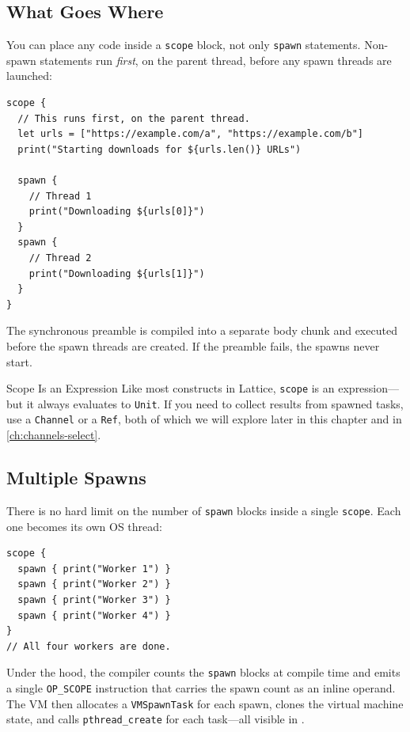 \subsection{What Goes Where}

You can place any code inside a \lstinline|scope| block, not only \lstinline|spawn| statements.
Non-spawn statements run \emph{first}, on the parent thread, before any spawn threads are launched:

\begin{lstlisting}[language=Lattice, caption={Synchronous setup inside a scope}]
scope {
  // This runs first, on the parent thread.
  let urls = ["https://example.com/a", "https://example.com/b"]
  print("Starting downloads for ${urls.len()} URLs")

  spawn {
    // Thread 1
    print("Downloading ${urls[0]}")
  }
  spawn {
    // Thread 2
    print("Downloading ${urls[1]}")
  }
}
\end{lstlisting}

The synchronous preamble is compiled into a separate body chunk and executed before the spawn threads are created.
If the preamble fails, the spawns never start.

\begin{notebox}{Scope Is an Expression}
Like most constructs in Lattice, \lstinline|scope| is an expression---but it always evaluates to \lstinline|Unit|.
If you need to collect results from spawned tasks, use a \lstinline|Channel| or a \lstinline|Ref|, both of which we will explore later in this chapter and in \cref{ch:channels-select}.
\end{notebox}

\subsection{Multiple Spawns}

There is no hard limit on the number of \lstinline|spawn| blocks inside a single \lstinline|scope|.
Each one becomes its own OS thread:

\begin{lstlisting}[language=Lattice, caption={Many spawns in one scope}]
scope {
  spawn { print("Worker 1") }
  spawn { print("Worker 2") }
  spawn { print("Worker 3") }
  spawn { print("Worker 4") }
}
// All four workers are done.
\end{lstlisting}

Under the hood, the compiler counts the \lstinline|spawn| blocks at compile time and emits a single \lstinline|OP_SCOPE| instruction that carries the spawn count as an inline operand.
The VM then allocates a \texttt{VMSpawnTask} for each spawn, clones the virtual machine state, and calls \texttt{pthread\_create} for each task---all visible in .

